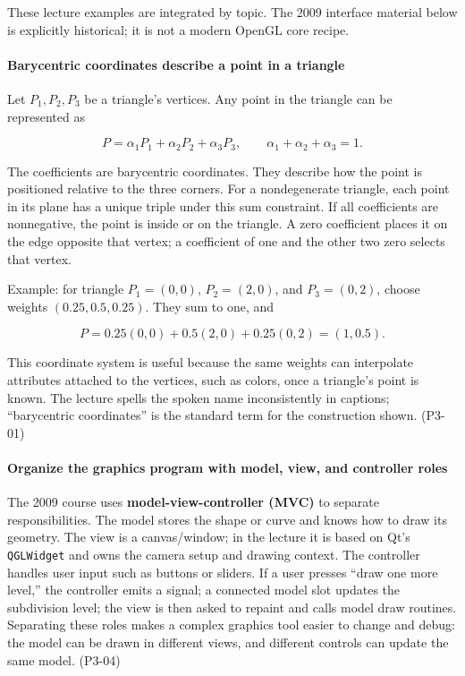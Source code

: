 These lecture examples are integrated by topic. The 2009 interface material below is explicitly historical; it is not a modern OpenGL core recipe.

\paragraph{Barycentric coordinates describe a point in a triangle}\label{barycentric-coordinates-describe-a-point-in-a-triangle}

Let \(P_1,P_2,P_3\) be a triangle's vertices. Any point in the triangle can be represented as

\[
P=\alpha_1P_1+\alpha_2P_2+\alpha_3P_3,
\qquad \alpha_1+\alpha_2+\alpha_3=1.
\]

The coefficients are barycentric coordinates. They describe how the point is positioned relative to the three corners. For a nondegenerate triangle, each point in its plane has a unique triple under this sum constraint. If all coefficients are nonnegative, the point is inside or on the triangle. A zero coefficient places it on the edge opposite that vertex; a coefficient of one and the other two zero selects that vertex.

Example: for triangle \(P_1=(0,0)\), \(P_2=(2,0)\), and \(P_3=(0,2)\), choose weights \((0.25,0.5,0.25)\). They sum to one, and

\[
P=0.25(0,0)+0.5(2,0)+0.25(0,2)=(1,0.5).
\]

This coordinate system is useful because the same weights can interpolate attributes attached to the vertices, such as colors, once a triangle's point is known. The lecture spells the spoken name inconsistently in captions; ``barycentric coordinates'' is the standard term for the construction shown. (P3-01)

\paragraph{Organize the graphics program with model, view, and controller roles}\label{organize-the-graphics-program-with-model-view-and-controller-roles}

The 2009 course uses \textbf{model-view-controller (MVC)} to separate responsibilities. The model stores the shape or curve and knows how to draw its geometry. The view is a canvas/window; in the lecture it is based on Qt's \texttt{QGLWidget} and owns the camera setup and drawing context. The controller handles user input such as buttons or sliders. If a user presses ``draw one more level,'' the controller emits a signal; a connected model slot updates the subdivision level; the view is then asked to repaint and calls model draw routines. Separating these roles makes a complex graphics tool easier to change and debug: the model can be drawn in different views, and different controls can update the same model. (P3-04)

